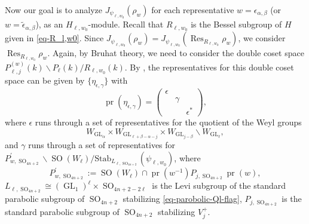 \documentclass[12pt]{amsart}
\newcommand{\Res}{\operatorname{Res}}
\theoremstyle{remark}
\newcommand{\pr}{\operatorname{pr}}
\DeclareMathOperator{\GL}{GL}
\DeclareMathOperator{\SO}{SO}
\begin{document}
Now our goal is to analyze $J_{\psi_{\ell, w_0}}(\rho_w)$ for each representative $w=\epsilon_{\alpha, \beta}$ (or $w= \tilde{\epsilon}_{\alpha,\beta}$), as an $H_{\ell, w_0}$-module.
Recall that $R_{\ell, w_0}$ is the Bessel subgroup of $H$ given in \eqref{eq-R_l,w0}.  
Since  $J_{\psi_{\ell, w_0}}(\rho_w)=J_{\psi_{\ell, w_0}}(\Res_{R_{\ell, w_0}}\rho_w)$, we consider $\Res_{R_{\ell, w_0}}\rho_w$. Again, by Bruhat theory, we need to consider the double coset space $P_{\ell, j}^{(w)}(k)\backslash P_{\ell}(k)/ R_{\ell,w_0}(k)$. By \cite[Lemma 3.8]{Yan2025GGP}, the representatives for this double coset space can be given by $\{\eta_{\epsilon, \gamma}\}$ with
\begin{equation}
\label{eq-eta}
\pr(\eta_{\epsilon,\gamma}) = \begin{pmatrix}
 \epsilon & & \\ & \gamma &\\ && \epsilon^*	
 \end{pmatrix} ,
 \end{equation}
where $\epsilon$ runs through a set of representatives for the quotient of the Weyl groups 
\begin{equation*}
	W_{\GL_{\alpha}}\times W_{\GL_{\ell+\beta-\alpha-j}}\times W_{\GL_{j-\beta}}\backslash W_{\GL_{\ell}},
\end{equation*}
and $\gamma$ runs through a set of representatives for $P_{w,\SO_{4n+2}}^\prime\backslash \SO(W_{\ell}) / \mathrm{Stab}_{L_{\ell,\SO_{4n+2}}}(\psi_{\ell, w_0})$, where 
\begin{equation*}
P_{w, \SO_{4n+2}}^\prime:= \SO(W_{\ell})\cap \pr(w^{-1})P_{j,\SO_{4n+2}} \pr(w)  ,
\end{equation*}
${L_{\ell,\SO_{4n+2}}}\cong (\GL_1)^{\ell}\times \SO_{4n+2-2\ell}$  is the Levi subgroup of the standard parabolic subgroup of $\SO_{4n+2}$ stabilizing \eqref{eq-parobolic-Ql-flag}, $P_{j,\SO_{4n+2}}$ is the standard parabolic subgroup of $\SO_{4n+2}$ stabilizing $V_j^+$. 
\end{document}
